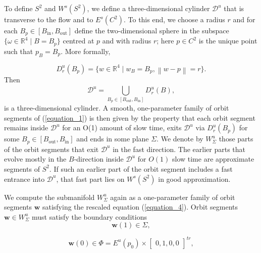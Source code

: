 \documentclass{ws-ijbc}
\begin{document}
To define $S^2$ and $W^s(S^2)$, we define a three-dimensional cylinder $\mathscr{D}^u$ that is transverse to the flow and to $E^s(C^2)$.  To this end, we choose a radius $r$ and for each $B_p \in [B_{\mathrm{in}}, B_{\mathrm{out}}]$ define the two-dimensional sphere in the subspace $\{\omega \in \mathbb{R}^4 \; | \; B=B_p\}$ centred at $p$ and with radius $r$; here $p \in C^2$ is the unique point such that $p_B = B_p$.  More formally,

\begin{equation*}
D^u_r(B_p)=\{w \in \mathbb{R}^4 \;|\; w_B = B_p, \left\lVert w-p \right\lVert  = r\}.
\end{equation*}
Then 
\begin{equation*}
\mathscr{D}^u = \bigcup\limits_{B_p \in [B_{\mathrm{out}}, B_{\mathrm{in}}]}^{}D^u_r(B),
\end{equation*}
is a three-dimensional cylinder.  A smooth, one-parameter family of orbit segments of (\ref{equation_1}) is then given by the property that each orbit segment remains inside $\mathscr{D}^u$ for an O(1) amount of slow time, exits $\mathscr{D}^u$ via $D^u_r(B_p)$ for some $B_p \in [B_{\text{out}}, B_{\text{in}}]$ and ends in some plane $\Sigma$.  We denote by $W^u_\Sigma$ those parts of the orbit segments that exit $\mathscr{D}^u$ in the fast direction.  The earlier parts that evolve mostly in the $B$-direction inside $\mathscr{D}^u$ for $O(1)$ slow time are approximate segments of $S^2$.  If such an earlier part of the orbit segment includes a fast entrance into $\mathscr{D}^u$, that fast part lies on $W^s(S^2)$ in good approximation.

We compute the submanifold $W^u_\Sigma$ again as a one-parameter family of orbit segments $\mathbf{w}$ satisfying the rescaled equation (\ref{equation_4}).  Orbit segments $\mathbf{w} \in W^u_\Sigma$ must satisfy the boundary conditions
\begin{equation}
	\mathbf{w}(1) \in \Sigma,
	\label{general_conditions_unstable_1}
\end{equation}

\begin{equation}
	\mathbf{w}(0) \in \Phi = E^u(p_0) \times \begin{bmatrix} 0, 1, 0, 0 \end{bmatrix}^{tr},
\label{general_conditions_unstable_2}
\end{equation}
\end{document}
